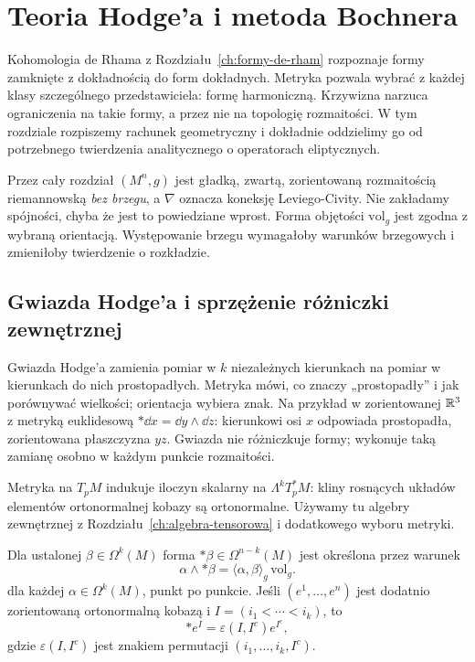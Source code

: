 \chapter{Teoria Hodge'a i metoda Bochnera}
\label{ch:hodge-bochner}

Kohomologia de Rhama z Rozdziału~\ref{ch:formy-de-rham}
rozpoznaje formy zamknięte z dokładnością do form dokładnych.
Metryka pozwala wybrać z każdej klasy szczególnego przedstawiciela:
formę harmoniczną. Krzywizna narzuca ograniczenia na takie formy,
a przez nie na topologię rozmaitości. W tym rozdziale rozpiszemy
rachunek geometryczny i dokładnie oddzielimy go od potrzebnego
twierdzenia analitycznego o operatorach eliptycznych.

Przez cały rozdział $(M^n,g)$ jest gładką, zwartą,
zorientowaną rozmaitością riemannowską \emph{bez brzegu},
a $\nabla$ oznacza koneksję Leviego-Civity.
Nie zakładamy spójności, chyba że jest to powiedziane wprost.
Forma objętości $\mathrm{vol}_g$ jest zgodna z wybraną orientacją.
Występowanie brzegu wymagałoby warunków brzegowych i zmieniłoby
twierdzenie o rozkładzie.

\section{Gwiazda Hodge'a i sprzężenie różniczki zewnętrznej}
\label{sec:hodge-gwiazda}

Gwiazda Hodge'a zamienia pomiar w $k$ niezależnych kierunkach
na pomiar w kierunkach do nich prostopadłych. Metryka mówi,
co znaczy „prostopadły” i jak porównywać wielkości;
orientacja wybiera znak. Na przykład w zorientowanej
$\mathbb{R}^3$ z metryką euklidesową $*\dd x=\dd y\wedge\dd z$:
kierunkowi osi $x$ odpowiada prostopadła, zorientowana
płaszczyzna $yz$. Gwiazda nie różniczkuje formy; wykonuje
taką zamianę osobno w każdym punkcie rozmaitości.

Metryka na $T_pM$ indukuje iloczyn skalarny na
$\Lambda^kT_p^*M$: kliny rosnących układów elementów
ortonormalnej kobazy są ortonormalne. Używamy tu algebry
zewnętrznej z Rozdziału~\ref{ch:algebra-tensorowa} i
dodatkowego wyboru metryki.

\begin{definicja}
\label{def:hodge-star}
Dla ustalonej $\beta\in\Omega^k(M)$ forma
$*\beta\in\Omega^{n-k}(M)$ jest określona przez warunek
\begin{equation}\label{eq:hodge-star-def}
 \alpha\wedge *\beta=\langle\alpha,\beta\rangle_g
                         \,\mathrm{vol}_g.
\end{equation}
dla każdej $\alpha\in\Omega^k(M)$, punkt po punkcie.
Jeśli $(e^1,\ldots,e^n)$ jest dodatnio zorientowaną
ortonormalną kobazą i $I=(i_1<\cdots<i_k)$, to
\[
 *e^I=\varepsilon(I,I^c)e^{I^c},
\]
gdzie $\varepsilon(I,I^c)$ jest znakiem permutacji
$(i_1,\ldots,i_k,I^c)$.
\end{definicja}

